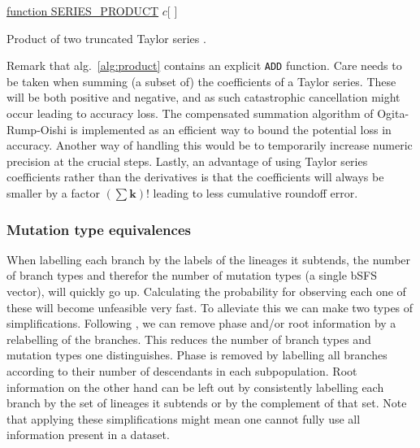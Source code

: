 \documentclass[10pt, a4]{article}
\begin{document}
\begin{algorithm}\label{alg:product}

    \underline{function SERIES\_PRODUCT}\;
    \Return $c$[ ]\;
    \caption{Product of two truncated Taylor series \citep{Neidinger2013}.}
\end{algorithm}

Remark that alg.\ \ref{alg:product} contains an explicit \texttt{ADD} function. Care needs to be taken when summing (a subset of) the coefficients of a Taylor series. These will be both positive and negative, and as such catastrophic cancellation might occur leading to accuracy loss. The compensated summation algorithm of Ogita-Rump-Oishi \citep{Ogita2005} is implemented as an efficient way to bound the potential loss in accuracy. Another way of handling this would be to temporarily increase numeric precision at the crucial steps. Lastly, an advantage of using Taylor series coefficients rather than the derivatives is that the coefficients will always be smaller by a factor $(\sum \boldsymbol{k})!$ leading to less cumulative roundoff error.


\subsubsection{Mutation type equivalences} %

When labelling each branch by the labels of the lineages it subtends, the number of branch types and therefor the number of mutation types (a single bSFS vector), will quickly go up. Calculating the probability for observing each one of these will become unfeasible very fast. To alleviate this we can make two types of simplifications. Following \citet{Lohse2016}, we can remove phase and/or root information by a relabelling of the branches. This reduces the number of branch types and mutation types one distinguishes. Phase is removed by labelling all branches according to their number of descendants in each subpopulation. Root information on the other hand can be left out by consistently labelling each branch by the set of lineages it subtends or by the complement of that set. Note that applying these simplifications might mean one cannot fully use all information present in a dataset.
\end{document}
